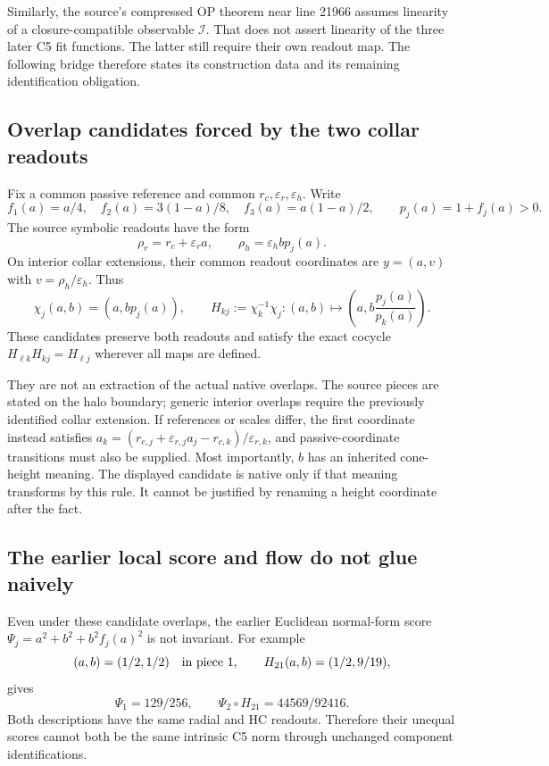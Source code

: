 \documentclass[11pt,a4paper]{article}
\begin{document}
Similarly, the source's compressed OP theorem near line 21966 assumes
linearity of a closure-compatible observable $\mathcal I$. That does
not assert linearity of the three later C5 fit functions. The latter
still require their own readout map. The following bridge therefore
states its construction data and its remaining identification obligation.

\subsection{Overlap candidates forced by the two collar readouts}
Fix a common passive reference and common $r_c,\varepsilon_r,
\varepsilon_h$. Write
\[
 f_1(a)=a/4,\quad f_2(a)=3(1-a)/8,\quad
 f_3(a)=a(1-a)/2,\qquad p_j(a)=1+f_j(a)>0.
\]
The source symbolic readouts have the form
\[
 \rho_r=r_c+\varepsilon_r a,\qquad
 \rho_h=\varepsilon_h b p_j(a).
\]
On interior collar extensions, their common readout coordinates are
$y=(a,v)$ with $v=\rho_h/\varepsilon_h$. Thus
\[
 \chi_j(a,b)=(a,bp_j(a)),\qquad
 H_{kj}:=\chi_k^{-1}\chi_j:
 (a,b)\longmapsto
 \left(a,b\frac{p_j(a)}{p_k(a)}\right).
\]
These candidates preserve both readouts and satisfy the exact cocycle
$H_{\ell k}H_{kj}=H_{\ell j}$ wherever all maps are defined.

They are not an extraction of the actual native overlaps. The source
pieces are stated on the halo boundary; generic interior overlaps
require the previously identified collar extension. If references or
scales differ, the first coordinate instead satisfies
$a_k=(r_{c,j}+\varepsilon_{r,j}a_j-r_{c,k})/\varepsilon_{r,k}$,
and passive-coordinate transitions must also be supplied. Most
importantly, $b$ has an inherited cone-height meaning. The displayed
candidate is native only if that meaning transforms by this rule.
It cannot be justified by renaming a height coordinate after the fact.

\subsection{The earlier local score and flow do not glue naively}
Even under these candidate overlaps, the earlier Euclidean normal-form
score $\Psi_j=a^2+b^2+b^2f_j(a)^2$ is not invariant. For example
\[
 (a,b)=(1/2,1/2)\quad\hbox{in piece 1},\qquad
 H_{21}(a,b)=(1/2,9/19),
\]
gives
\[
 \Psi_1=129/256,\qquad \Psi_2\circ H_{21}=44569/92416.
\]
Both descriptions have the same radial and HC readouts. Therefore
their unequal scores cannot both be the same intrinsic C5 norm through
unchanged component identifications.
\end{document}
